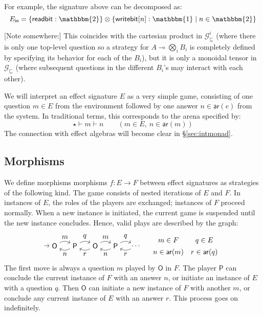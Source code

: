 \documentclass[format=sigplan,authordraft]{acmart}
\newcommand{\gcat}{\mathcal{G}_{\sqsubseteq}}
\newcommand{\kw}[1]{\ensuremath{ \mathsf{#1} }}
\begin{document}
For example,
the signature above can be decomposed as:
\[
    E_\kw{io} = \{ \kw{readbit} : \mathbbm{2} \} \otimes
      \{ \kw{writebit}[n] : \mathbbm{1} \mid n \in \mathbbm{2} \}
\]

[Note somewhere:]
This coincides with the cartesian product in $\gcat^i$
(where there is only one top-level question
so a strategy for $A \multimap \bigotimes_i B_i$
is completely defined
by specifying its behavior for each of the $B_i$),
but it is only a monoidal tensor in $\gcat$
(where subsequent questions in the different $B_i$'s
may interact with each other).

We will interpret an effect signature $E$
as a very simple game,
consisting of
one question $m \in E$ from the environment followed by
one answer $n \in \kw{ar}(e)$ from the system.
In traditional terms,
this corresponds to the arena specified by:
\[
    \star \vdash m \vdash n \qquad
      (m \in E, \: n \in \kw{ar}(m))
\]
The connection with
effect algebras will become clear in \S\ref{sec:intmonad}.


\subsection{Morphisms} %
\label{sec:arrow}

We define morphisms morphisms $f : E \rightarrow F$
between effect signatures
as strategies of the following kind.
The game consists of nested iterations of $E$ and $F$.
In instances of $E$, the roles of the players are exchanged;
instances of $F$ proceed normally.
When a new instance is initiated,
the current game is suspended
until the new instance concludes.
Hence, valid plays
are described by the graph:
\[
  \begin{tikzpicture}[baseline=(O1.base)]
    \node (O1) at (0,0) {\kw{O}};
    \node (P1) at (1,0) {\kw{P}};
    \node (O2) at (2,0) {\kw{O}};
    \node (P2) at (3,0) {\kw{P}};
    \node (O3) at (4,0) {$\ldots$};
    \path [->] (-0.5,0) edge (O1);
    \path [->] (O1) edge[bend left] node[auto] {$m$} (P1);
    \path [->] (P1) edge[bend left] node[auto] {$n$} (O1);
    \path [->] (P1) edge[bend left] node[auto] {$q$} (O2);
    \path [->] (O2) edge[bend left] node[auto] {$r$} (P1);
    \path [->] (O2) edge[bend left] node[auto] {$m$} (P2);
    \path [->] (P2) edge[bend left] node[auto] {$n$} (O2);
    \path [->] (P2) edge[bend left] node[auto] {$q$} (O3);
    \path [->] (O3) edge[bend left] node[auto] {$r$} (P2);
  \end{tikzpicture}
  \quad
  \begin{array}{cc}
    m \in F & q \in E \\[1ex]
    n \in \kw{ar}(m) & r \in \kw{ar}(q)
  \end{array}
\]
The first move is always a question $m$ played by $\kw{O}$ in $F$.
The player $\kw{P}$ can conclude the current instance of $F$
with an answer $n$, or
initiate an instance of $E$
with a question $q$.
Then $\kw{O}$ can initiate a new instance of $F$
with another $m$, or
conclude any current instance of $E$
with an answer $r$.
This process goes on indefinitely.
\end{document}
